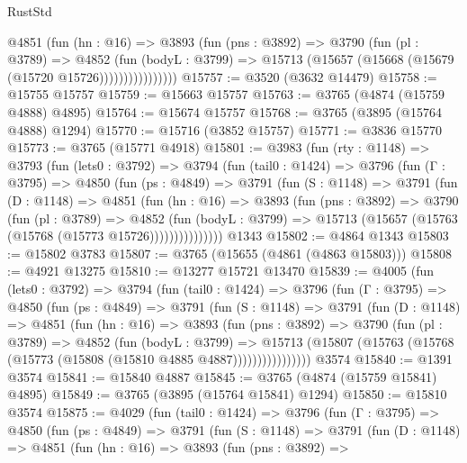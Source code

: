 \begin{lexlean}{RustStd}
\begin{coremodule}
                  @4851
                    (fun (hn : @16) =>
                    @3893
                      (fun (pns : @3892) =>
                      @3790
                        (fun (pl : @3789) =>
                        @4852
                          (fun (bodyL : @3799) =>
                          @15713 (@15657 (@15668 (@15679 (@15720 @15726))))))))))))))))
@15757 := @3520 (@3632 @14479)
@15758 := @15755 @15757
@15759 := @15663 @15757
@15763 := @3765 (@4874 (@15759 @4888) @4895)
@15764 := @15674 @15757
@15768 := @3765 (@3895 (@15764 @4888) @1294)
@15770 := @15716 (@3852 @15757)
@15771 := @3836 @15770
@15773 := @3765 (@15771 @4918)
@15801 := @3983
    (fun (rty : @1148) =>
    @3793
      (fun (lets0 : @3792) =>
      @3794
        (fun (tail0 : @1424) =>
        @3796
          (fun (Γ : @3795) =>
          @4850
            (fun (ps : @4849) =>
            @3791
              (fun (S : @1148) =>
              @3791
                (fun (D : @1148) =>
                @4851
                  (fun (hn : @16) =>
                  @3893
                    (fun (pns : @3892) =>
                    @3790
                      (fun (pl : @3789) =>
                      @4852
                        (fun (bodyL : @3799) =>
                        @15713 (@15657 (@15763 (@15768 (@15773 @15726)))))))))))))))
    @1343
@15802 := @4864 @1343
@15803 := @15802 @3783
@15807 := @3765 (@15655 (@4861 (@4863 @15803)))
@15808 := @4921 @13275
@15810 := @13277 @15721 @13470
@15839 := @4005
    (fun (lets0 : @3792) =>
    @3794
      (fun (tail0 : @1424) =>
      @3796
        (fun (Γ : @3795) =>
        @4850
          (fun (ps : @4849) =>
          @3791
            (fun (S : @1148) =>
            @3791
              (fun (D : @1148) =>
              @4851
                (fun (hn : @16) =>
                @3893
                  (fun (pns : @3892) =>
                  @3790
                    (fun (pl : @3789) =>
                    @4852
                      (fun (bodyL : @3799) =>
                      @15713
                        (@15807 (@15763 (@15768 (@15773 (@15808 (@15810 @4885 @4887))))))))))))))))
    @3574
@15840 := @1391 @3574
@15841 := @15840 @4887
@15845 := @3765 (@4874 (@15759 @15841) @4895)
@15849 := @3765 (@3895 (@15764 @15841) @1294)
@15850 := @15810 @3574
@15875 := @4029
    (fun (tail0 : @1424) =>
    @3796
      (fun (Γ : @3795) =>
      @4850
        (fun (ps : @4849) =>
        @3791
          (fun (S : @1148) =>
          @3791
            (fun (D : @1148) =>
            @4851
              (fun (hn : @16) =>
              @3893
                (fun (pns : @3892) =>

\end{coremodule}
\end{lexlean}
